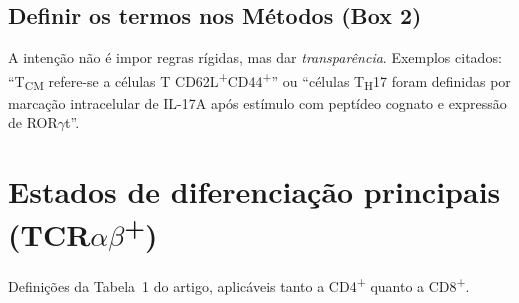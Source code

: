 \documentclass[11pt,a4paper]{article}
\newcommand{\up}[1]{\textsuperscript{#1}}          %
\newcommand{\tc}[1]{T\textsubscript{#1}}           %
\newcommand{\rort}{ROR\ensuremath{\gamma}t}
\begin{document}
\subsection{Definir os termos nos Métodos (Box 2)}
A intenção não é impor regras rígidas, mas dar \emph{transparência}. Exemplos citados:
``\tc{CM} refere-se a células T CD62L\up{+}CD44\up{+}'' ou ``células \tc{H}17 foram definidas por
marcação intracelular de IL-17A após estímulo com peptídeo cognato e expressão de \rort{}''.

\section{Estados de diferenciação principais (TCR\texorpdfstring{$\alpha\beta$}{ab}\up{+})}
Definições da Tabela~1 do artigo, aplicáveis tanto a CD4\up{+} quanto a CD8\up{+}.
\end{document}
